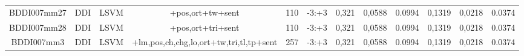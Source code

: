 \documentclass[a4paper]{article}
\begin{document}
\begin{landscape}
\begin{center}
\begin{tabular}{ |c|c|c|c|c|c|c|c|c|c|c|c|}
 	
 		
 		\small{ BDDI007mm27 } & DDI & LSVM & +pos,ort+tw+sent  &  110 &  -3:+3  &  0,321 & 0,0588 & 0.0994  &  0,1319 & 0,0218 & 0.0374 \\
 		

 	
 
 	
 		
 		\small{ BDDI007mm28 } & DDI & LSVM & +pos,ort+tri+sent  &  110 &  -3:+3  &  0,321 & 0,0588 & 0.0994  &  0,1319 & 0,0218 & 0.0374 \\
 		

 	
 
 	
 		
 		\small{ BDDI007mm3 } & DDI & LSVM & +lm,pos,ch,chg,lo,ort+tw,tri,tl,tp+sent  &  257 &  -3:+3  &  0,321 & 0,0588 & 0.0994  &  0,1319 & 0,0218 & 0.0374 \\
 		

 	
 
 	
 
 	
 
 	
 
 	
 
 	
 
 	
 
 	
 
 	
 
 	
 
 	
 
 	
 
 	
 
 	
 
 	
 
 	
 
 	
 
 	
 
 	
 
 	
 
 	
 
 	
 
 	
 
 	
 
 	
 
 	
 
 	
 
 	
 
 	
 
 	
 
 	
 
 	
 
 	
 
 	
 
 	
 
 	
 
 	
 
 	
 

\end{tabular}
\end{center}
\end{landscape}
\end{document}
